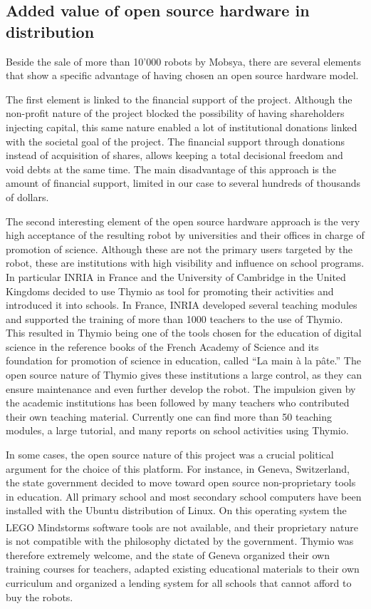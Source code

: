 \documentclass[letterpaper, 10 pt, conference]{ieeeconf}  %
\begin{document}
\iffalse
\subsection{Added value of open source hardware in distribution}

Beside the sale of more than 10'000 robots by Mobsya, there are several elements that show a specific advantage of having chosen an open source hardware model.

The first element is linked to the financial support of the project.
Although the non-profit nature of the project blocked the possibility of having shareholders injecting capital, this same nature enabled a lot of institutional donations linked with the societal goal of the project.
The financial support through donations instead of acquisition of shares, allows keeping a total decisional freedom and void debts at the same time.
The main disadvantage of this approach is the amount of financial support, limited in our case to several hundreds of thousands of dollars. 

The second interesting element of the open source hardware approach is the very high acceptance of the resulting robot by universities and their offices in charge of promotion of science.
Although these are not the primary users targeted by the robot, these are institutions with high visibility and influence on school programs. 
In particular INRIA in France and the University of Cambridge in the United Kingdoms decided to use Thymio as tool for promoting their activities and introduced it into schools.
In France, INRIA developed several teaching modules and supported the training of more than 1000 teachers to the use of Thymio. 
This resulted in Thymio being one of the tools chosen for the education of digital science in the reference books of the French Academy of Science and its foundation for promotion of science in education, called ``La main \`a la p\^ate.''
The open source nature of Thymio gives these institutions a large control, as they can ensure maintenance and even further develop the robot.
The impulsion given by the academic institutions has been followed by many teachers who contributed their own teaching material. 
Currently one can find more than 50 teaching modules, a large tutorial, and many reports on school activities using Thymio. 

In some cases, the open source nature of this project was a crucial political argument for the choice of this platform.
For instance, in Geneva, Switzerland, the state government decided to move toward open source non-proprietary tools in education.
All primary school and most secondary school computers have been installed with the Ubuntu distribution of Linux. 
On this operating system the LEGO\textsuperscript{\textregistered} Mindstorms\textsuperscript{\textregistered} software tools are not available, and their proprietary nature is not compatible with the philosophy dictated by the government. 
Thymio was therefore extremely welcome, and the state of Geneva organized their own training courses for teachers, adapted existing educational materials to their own curriculum and organized a lending system for all schools that cannot afford to buy the robots.
\end{document}
